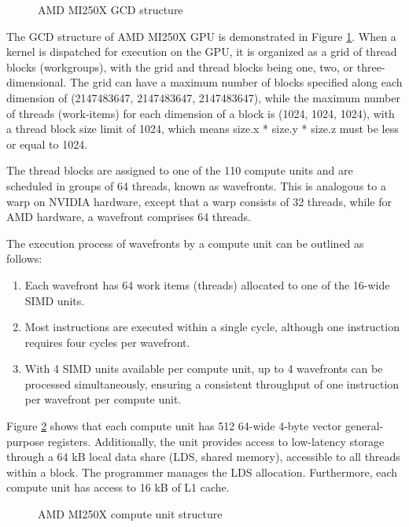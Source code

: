 \begin{figure}[H]
    \centering
    \caption{AMD MI250X GCD structure \cite{lumi}}
    \label{mi250x-gcd.svg}
\end{figure}

The GCD structure of AMD MI250X GPU is demonstrated in Figure \ref{mi250x-gcd.svg}. When a kernel is dispatched for execution on the GPU, it is organized as a grid of thread blocks (workgroups), with the grid and thread blocks being one, two, or three-dimensional. The grid can have a maximum number of blocks specified along each dimension of (2147483647, 2147483647, 2147483647), while the maximum number of threads (work-items) for each dimension of a block is (1024, 1024, 1024), with a thread block size limit of 1024, which means size.x * size.y * size.z must be less or equal to 1024.

The thread blocks are assigned to one of the 110 compute units and are scheduled in groups of 64 threads, known as wavefronts. This is analogous to a warp on NVIDIA hardware, except that a warp consists of 32 threads, while for AMD hardware, a wavefront comprises 64 threads.

The execution process of wavefronts by a compute unit can be outlined as follows:

\begin{enumerate}
    \item Each wavefront has 64 work items (threads) allocated to one of the  16-wide SIMD units.
    \item Most instructions are executed within a single cycle, although one instruction requires four cycles per wavefront.
    \item With 4 SIMD units available per compute unit, up to 4 wavefronts can be processed simultaneously, ensuring a consistent throughput of one instruction per wavefront per compute unit.
\end{enumerate}

Figure \ref{mi250x-compute-unit.svg} shows that each compute unit has 512 64-wide 4-byte vector general-purpose registers. Additionally, the unit provides access to low-latency storage through a 64 kB local data share (LDS, shared memory), accessible to all threads within a block. The programmer manages the LDS allocation. Furthermore, each compute unit has access to 16 kB of L1 cache.

\begin{figure}[H]
    \centering
    \caption{AMD MI250X compute unit structure \cite{lumi}}
    \label{mi250x-compute-unit.svg}
\end{figure}

